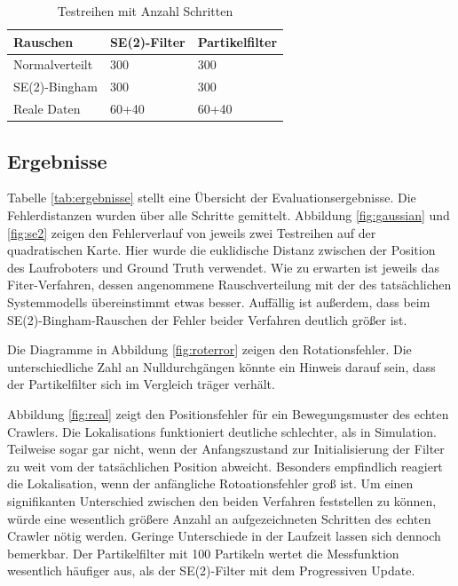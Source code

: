 \begin{table}[h!]
	\centering
	\caption{Testreihen mit Anzahl Schritten}
	\label{tab:testreihen}
	\begin{tabular}{lll}
		\toprule
		Rauschen &  SE(2)-Filter &  Partikelfilter\\
		\midrule
		Normalverteilt 	& 300       & 300\\
		SE(2)-Bingham 	& 300		& 300\\
		Reale Daten 	& 60+40		& 60+40\\
		\bottomrule
	\end{tabular}
\end{table}


\subsection{Ergebnisse}

Tabelle \ref{tab:ergebnisse} stellt eine Übersicht der Evaluationsergebnisse. Die Fehlerdistanzen wurden über alle Schritte gemittelt.
Abbildung \ref{fig:gaussian} und \ref{fig:se2} zeigen den Fehlerverlauf von jeweils zwei Testreihen auf der quadratischen Karte. Hier wurde die euklidische Distanz zwischen der Position des Laufroboters und Ground Truth verwendet. Wie zu erwarten ist jeweils das Fiter-Verfahren, dessen angenommene Rauschverteilung mit der des tatsächlichen Systemmodells übereinstimmt etwas besser. Auffällig ist außerdem, dass beim SE(2)-Bingham-Rauschen der Fehler beider Verfahren deutlich größer ist.

Die Diagramme in Abbildung \ref{fig:roterror} zeigen den Rotationsfehler. Die unterschiedliche Zahl an Nulldurchgängen könnte ein Hinweis darauf sein, dass der Partikelfilter sich im Vergleich träger verhält.

Abbildung \ref{fig:real} zeigt den Positionsfehler für ein Bewegungsmuster des echten Crawlers. Die Lokalisations funktioniert deutliche schlechter, als in Simulation. Teilweise sogar gar nicht, wenn der Anfangszustand zur Initialisierung der Filter zu weit vom der tatsächlichen Position abweicht. Besonders empfindlich reagiert die Lokalisation, wenn der anfängliche Rotoationsfehler groß ist. Um einen signifikanten Unterschied zwischen den beiden Verfahren feststellen zu können, würde eine wesentlich größere Anzahl an aufgezeichneten Schritten des echten Crawler nötig werden.
Geringe Unterschiede in der Laufzeit lassen sich dennoch bemerkbar. Der Partikelfilter mit 100 Partikeln wertet die Messfunktion wesentlich häufiger aus, als der SE(2)-Filter mit dem Progressiven Update.

